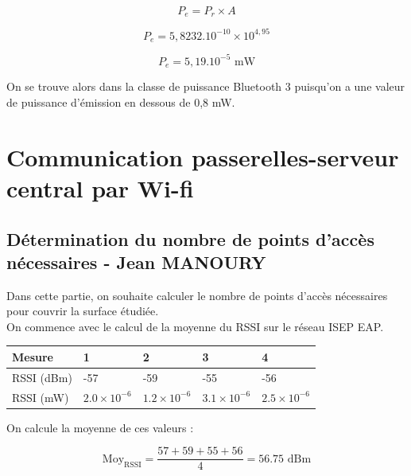 \documentclass[12]{article}
\begin{document}
\begin{equation*}
    P_{e} = P_{r} \times A
\end{equation*}
    
\begin{equation*}
    P_{e} = 5,8232.10^{-10} \times 10^{4,95}
\end{equation*}

\begin{equation*}
    P_{e} = 5,19.10^{-5} \text{ mW}
\end{equation*}
    
On se trouve alors dans la classe de puissance Bluetooth 3 puisqu'on a une valeur de puissance d'émission en dessous de 0,8 mW.

\section{Communication passerelles-serveur central par Wi-fi}

\subsection{Détermination du nombre de points d'accès nécessaires - Jean MANOURY}

Dans cette partie, on souhaite calculer le nombre de points d'accès nécessaires pour couvrir la surface étudiée. \\

On commence avec le calcul de la moyenne du RSSI sur le réseau ISEP EAP.

\begin{table}[H]
\centering
\begin{tabular}{|l|l|l|l|l|}
\hline
\rowcolor[HTML]{000000} 
{\color[HTML]{FFFFFF} Mesure} & {\color[HTML]{FFFFFF} 1} & {\color[HTML]{FFFFFF} 2} & {\color[HTML]{FFFFFF} 3} & {\color[HTML]{FFFFFF} 4} \\ \hline
RSSI (dBm) & -57 & -59 & -55 & -56 \\ \hline
RSSI (mW) & $2.0 \times 10^{-6}$ & $1.2 \times 10^{-6}$ & $3.1 \times 10^{-6}$ & $2.5 \times 10^{-6}$ \\ \hline
\end{tabular}
\end{table}

On calcule la moyenne de ces valeurs :

\begin{equation*}
\text{Moy}_\text{RSSI} = \frac{57 + 59 + 55 + 56}{4} = 56.75\text{ dBm}
\end{equation*}
\end{document}
